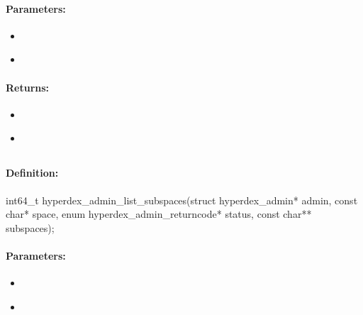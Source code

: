 \paragraph{Parameters:}
\begin{itemize}[noitemsep]
\item {}\\

\item {}\\

\end{itemize}

\paragraph{Returns:}
\begin{itemize}[noitemsep]
\item {}\\

\item {}\\

\end{itemize}

\pagebreak
\subsection{}
\label{api:c:list_subspaces}


\paragraph{Definition:}
\begin{ccode}
int64_t hyperdex_admin_list_subspaces(struct hyperdex_admin* admin,
        const char* space,
        enum hyperdex_admin_returncode* status,
        const char** subspaces);
\end{ccode}

\paragraph{Parameters:}
\begin{itemize}[noitemsep]
\item {}\\

\item {}\\

\end{itemize}

